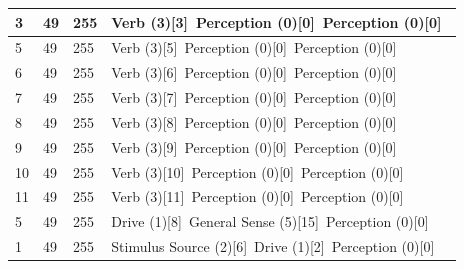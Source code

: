 \documentclass{article}
\begin{document}
\begin{longtable}{|p{3cm}|p{3cm}|p{3cm}|p{5cm}|}
3 & 49 & 255 & Verb (3)[3]~\newline Perception (0)[0]~\newline Perception (0)[0]~\newline  \\ \hline
5 & 49 & 255 & Verb (3)[5]~\newline Perception (0)[0]~\newline Perception (0)[0]~\newline  \\ \hline
6 & 49 & 255 & Verb (3)[6]~\newline Perception (0)[0]~\newline Perception (0)[0]~\newline  \\ \hline
7 & 49 & 255 & Verb (3)[7]~\newline Perception (0)[0]~\newline Perception (0)[0]~\newline  \\ \hline
8 & 49 & 255 & Verb (3)[8]~\newline Perception (0)[0]~\newline Perception (0)[0]~\newline  \\ \hline
9 & 49 & 255 & Verb (3)[9]~\newline Perception (0)[0]~\newline Perception (0)[0]~\newline  \\ \hline
10 & 49 & 255 & Verb (3)[10]~\newline Perception (0)[0]~\newline Perception (0)[0]~\newline  \\ \hline
11 & 49 & 255 & Verb (3)[11]~\newline Perception (0)[0]~\newline Perception (0)[0]~\newline  \\ \hline
5 & 49 & 255 & Drive (1)[8]~\newline General Sense (5)[15]~\newline Perception (0)[0]~\newline  \\ \hline
1 & 49 & 255 & Stimulus Source (2)[6]~\newline Drive (1)[2]~\newline Perception (0)[0]~\newline  \\ \hline
\end{longtable}
\end{document}
